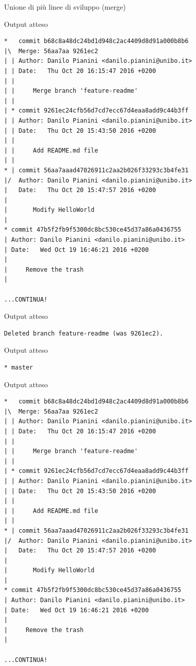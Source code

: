 \documentclass[presentation]{beamer}
\begin{document}
\begin{frame}{Unione di più linee di sviluppo (merge)}
	\begin{block}{Output atteso}
		\begin{Verbatim}[fontsize=\tiny]
*   commit b68c8a48dc24bd1d948c2ac4409d8d91a000b8b6
|\  Merge: 56aa7aa 9261ec2
| | Author: Danilo Pianini <danilo.pianini@unibo.it>
| | Date:   Thu Oct 20 16:15:47 2016 +0200
| | 
| |     Merge branch 'feature-readme'
| |   
| * commit 9261ec24cfb56d7cd7ecc67d4eaa8add9c44b3ff
| | Author: Danilo Pianini <danilo.pianini@unibo.it>
| | Date:   Thu Oct 20 15:43:50 2016 +0200
| | 
| |     Add README.md file
| |   
* | commit 56aa7aaad47026911c2aa2b026f33293c3b4fe31
|/  Author: Danilo Pianini <danilo.pianini@unibo.it>
|   Date:   Thu Oct 20 15:47:57 2016 +0200
|   
|       Modify HelloWorld
|  
* commit 47b5f2fb9f5300dc8bc530ce45d37a86a0436755
| Author: Danilo Pianini <danilo.pianini@unibo.it>
| Date:   Wed Oct 19 16:46:21 2016 +0200
| 
|     Remove the trash
|  

...CONTINUA!
		\end{Verbatim}
	\end{block}
	\begin{block}{Output atteso}
		\begin{Verbatim}[fontsize=\scriptsize]
Deleted branch feature-readme (was 9261ec2).
		\end{Verbatim}
	\end{block}
	\begin{block}{Output atteso}
		\begin{Verbatim}[fontsize=\scriptsize]
* master
		\end{Verbatim}
	\end{block}
	\begin{block}{Output atteso}
		\begin{Verbatim}[fontsize=\tiny]
*   commit b68c8a48dc24bd1d948c2ac4409d8d91a000b8b6
|\  Merge: 56aa7aa 9261ec2
| | Author: Danilo Pianini <danilo.pianini@unibo.it>
| | Date:   Thu Oct 20 16:15:47 2016 +0200
| | 
| |     Merge branch 'feature-readme'
| |   
| * commit 9261ec24cfb56d7cd7ecc67d4eaa8add9c44b3ff
| | Author: Danilo Pianini <danilo.pianini@unibo.it>
| | Date:   Thu Oct 20 15:43:50 2016 +0200
| | 
| |     Add README.md file
| |   
* | commit 56aa7aaad47026911c2aa2b026f33293c3b4fe31
|/  Author: Danilo Pianini <danilo.pianini@unibo.it>
|   Date:   Thu Oct 20 15:47:57 2016 +0200
|   
|       Modify HelloWorld
|  
* commit 47b5f2fb9f5300dc8bc530ce45d37a86a0436755
| Author: Danilo Pianini <danilo.pianini@unibo.it>
| Date:   Wed Oct 19 16:46:21 2016 +0200
| 
|     Remove the trash
|  

...CONTINUA!
		\end{Verbatim}
	\end{block}
\end{frame}
\end{document}
